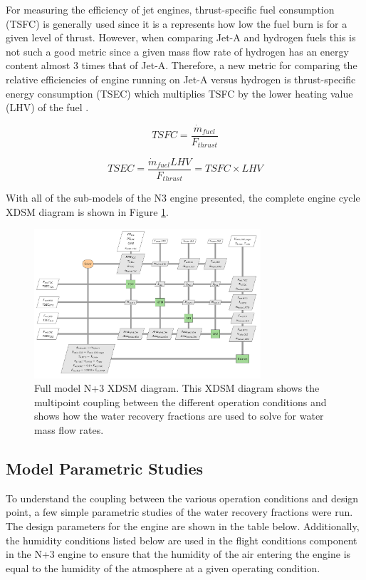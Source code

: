 \documentclass[conf]{new-aiaa}
\begin{document}
For measuring the efficiency of jet engines, thrust-specific fuel consumption (TSFC) is generally used since it is a represents how low the fuel burn is for a given level of thrust.
However, when comparing Jet-A and hydrogen fuels this is not such a good metric since a given mass flow rate of hydrogen has an energy content almost 3 times that of Jet-A.
Therefore, a new metric for comparing the relative efficiencies of engine running on Jet-A versus hydrogen is thrust-specific energy consumption (TSEC) which multiplies TSFC by the lower heating value (LHV) of the fuel \cite{Adler2023}.

\begin{equation}
    TSFC = \frac{\Dot{m}_{fuel}}{F_{thrust}}
\end{equation}

\begin{equation}
    TSEC = \frac{\Dot{m}_{fuel} LHV}{F_{thrust}} = TSFC \times LHV
\end{equation}

With all of the sub-models of the N3 engine presented, the complete engine cycle XDSM diagram is shown in Figure \ref{fig:N3_xdsm_full}.

\begin{figure}[hbt!]
    \centering
    \includegraphics[width=0.75\textwidth]{N3_xdsm_full.pdf}
    \caption{
        Full model N+3 XDSM diagram.
        This XDSM diagram shows the multipoint coupling between the different operation conditions and shows how the water recovery fractions are used to solve for water mass flow rates.
    }
    \label{fig:N3_xdsm_full}
\end{figure}

\subsection{Model Parametric Studies}
To understand the coupling between the various operation conditions and design point, a few simple parametric studies of the water recovery fractions were run.
The design parameters for the engine are shown in the table below.
Additionally, the humidity conditions listed below are used in the flight conditions component in the N+3 engine to ensure that the humidity of the air entering the engine is equal to the humidity of the atmosphere at a given operating condition.
\end{document}
